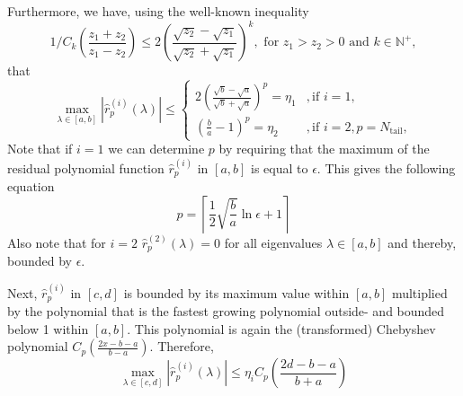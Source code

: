 Furthermore, we have, using the well-known inequality 
\begin{equation}
    1/C_{k}\left(\frac{z_1 + z_2}{z_1 - z_2}\right) \leq 2 \left(\frac{\sqrt{z_2} - \sqrt{z_1}}{\sqrt{z_2} + \sqrt{z_1}}\right)^k, \text{ for } z_1 > z_2 > 0 \text{ and } k \in \mathbb{N}^+,
    \label{eq:chebyshev_polynomial_bound}
\end{equation}
that
\begin{equation*}
    \max_{\lambda \in [a,b]} |\hat{r}^{(i)}_p(\lambda)| \leq
    \begin{cases}
        2\left(\frac{\sqrt{b}-\sqrt{a}}{\sqrt{b}+\sqrt{a}}\right)^p=\eta_1 &, \text{if } i = 1,\\
        \left(\frac{b}{a}-1\right)^p=\eta_2 &, \text{if } i = 2, p = N_{\text{tail}},
    \end{cases}
\end{equation*}
Note that if $i=1$ we can determine $p$ by requiring that the maximum of the residual polynomial function $\hat{r}^{(i)}_p$ in $[a,b]$ is equal to $\epsilon$. This gives the following equation
\begin{equation}
    p = \left\lceil\frac{1}{2}\sqrt{\frac{b}{a}}\ln{\epsilon} + 1\right\rceil
    \label{eq:chebyshev_degree_p}
\end{equation}
Also note that for $i=2$ $\hat{r}^{(2)}_p(\lambda) = 0$ for all eigenvalues $\lambda \in [a,b]$ and thereby, bounded by $\epsilon$.

Next, $\hat{r}^{(i)}_p$ in $[c,d]$ is bounded by its maximum value within $[a,b]$ multiplied by the polynomial that is the fastest growing polynomial outside- and bounded below 1 within $[a,b]$. This polynomial is again the (transformed) Chebyshev polynomial $C_{p}\left(\frac{2x - b - a}{b - a}\right)$. Therefore,
\begin{equation*}
    \max_{\lambda \in [c,d]} |\hat{r}^{(i)}_p(\lambda)| \leq \eta_i C_{p}\left(\frac{2d - b - a}{b + a}\right)
\end{equation*}

